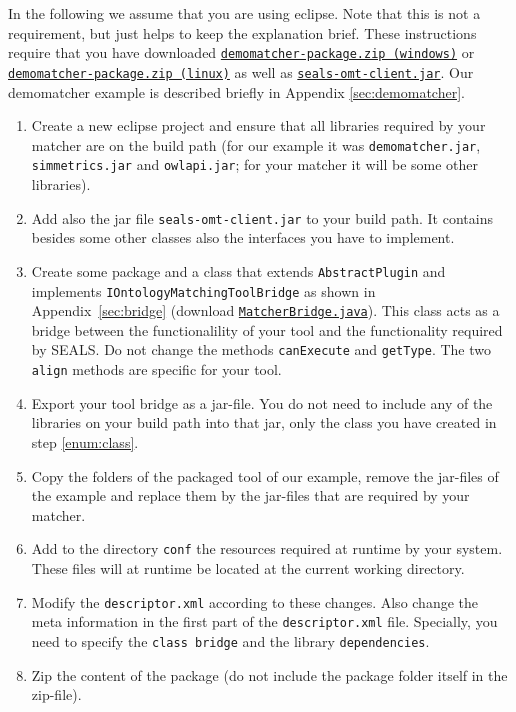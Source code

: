 \documentclass{article}
\def\file#1{\textcolor{grayy}{\texttt{#1}}}
\begin{document}
In the following we assume that you are using eclipse. Note that this is not a requirement, but just helps to keep the explanation brief. These instructions require that you have downloaded \href{http://oaei.ontologymatching.org/2011/tutorial/windows/demomatcher-package.zip}{\nolinkurl{demomatcher-package.zip (windows)}} or \href{http://oaei.ontologymatching.org/2011/tutorial/linux/demomatcher-package.zip}{\nolinkurl{demomatcher-package.zip (linux)}} as well as \href{http://oaei.ontologymatching.org/2011.5/tutorial/seals-omt-client.jar}{\nolinkurl{seals-omt-client.jar}}. Our demomatcher example is described briefly in Appendix \ref{sec:demomatcher}.
\begin{enumerate}
	\item Create a new eclipse project and ensure that all libraries required by your matcher are on the build path (for our example it was \file{demomatcher.jar}, \file{simmetrics.jar} and \file{owlapi.jar}; for your matcher it will be some other libraries).
	\item Add also the jar file \file{seals-omt-client.jar} to your build path. It contains besides some other classes also the interfaces you have to implement.

	\item Create some package and a class that extends \verb|AbstractPlugin| and implements \verb|IOntologyMatchingToolBridge| as shown in Appendix~\ref{sec:bridge} (download \href{http://oaei.ontologymatching.org/2011/tutorial/MatcherBridge.java}{\nolinkurl{MatcherBridge.java}}). This class acts as a bridge between the functionalility of your tool and the functionality required by SEALS. Do not change the methods  \verb|canExecute| and \verb|getType|. The two \verb|align| methods are specific for your tool. \label{enum:class}
	\item Export your tool bridge as a jar-file. You do not need to include any of the libraries on your build path into that jar, only the class you have created in step \ref{enum:class}.
	\item Copy the folders of the packaged tool of our example, remove the jar-files of the example and replace them by the jar-files that are required by your matcher.
	\item Add to the directory \file{conf} the resources required at runtime by your system. These files will at runtime be located at the current working directory.
	\item Modify the \file{descriptor.xml} according to these changes. Also change the meta information in the first part of the \file{descriptor.xml} file. Specially, you need to specify the \verb|class bridge| and the library \verb|dependencies|. 
	\item Zip the content of the package (do not include the package folder itself in the zip-file).
\end{enumerate}
\end{document}
